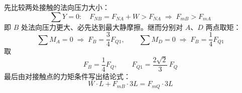 \begin{longexample}
\begin{solution}

先比较两处接触的法向压力大小：
\begin{equation}\label{eq:4-multi-sumY}
  \sum Y = 0:\quad
  F_{NB} = F_{NA} + W > F_{NA}
  \;\Longrightarrow\; F_{mB} > F_{mA}
\end{equation}
即 $B$ 处法向压力更大、必先达到最大静摩擦。继而分别对 $A$、$D$ 两点取矩：
\begin{equation}\label{eq:4-multi-MA}
  \sum M_A = 0 \;\Rightarrow\; F_B = \frac{3}{4}F_{Q1},
  \qquad
  \sum M_D = 0 \;\Rightarrow\; F_B = \frac{1}{4}F_{Q1}
\end{equation}
取
\begin{equation}\label{eq:4-multi-FB}
  F_B = \frac{1}{4}F_{Q}, \qquad F_{Q1} = \frac{2\sqrt{2}}{3}\,F_{Q}
\end{equation}
最后由对接触点的力矩条件写出结论式：
\begin{equation}\label{eq:4-multi-final}
  W\cdot L + F_{mB}\cdot 3L = F_{mQ}\cdot 3L
\end{equation}
\end{solution}
\end{longexample}
